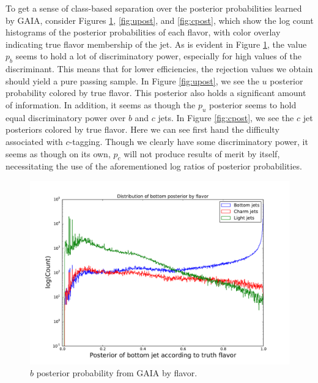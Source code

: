 To get a sense of class-based separation over the posterior probabilities learned by GAIA, consider Figures \ref{fig:bpost}, \ref{fig:upost}, and \ref{fig:cpost}, which show the log count histograms of the posterior probabilities of each flavor, with color overlay indicating true flavor membership of the jet. As is evident in Figure \ref{fig:bpost}, the value $p_b$ seems to hold a lot of discriminatory power, especially for high values of the discriminant. This means that for lower efficiencies, the rejection values we obtain should yield a pure passing sample. In Figure \ref{fig:upost}, we see the $u$ posterior probability colored by true flavor. This posterior also holds a significant amount of information. In addition, it seems as though the $p_u$ posterior seems to hold equal discriminatory power over $b$ and $c$ jets. In Figure \ref{fig:cpost}, we see the $c$ jet posteriors colored by true flavor. Here we can see first hand the difficulty associated with $c$-tagging. Though we clearly have some discriminatory power, it seems as though on its own, $p_c$ will not produce results of merit by itself, necessitating the use of the aforementioned log ratios of posterior probabilities. 



\begin{figure}[h]
\includegraphics[width=\textwidth]{figures/unweight_bottom_p_distro}
\caption[The ATLAS detector]{$b$ posterior probability from GAIA by flavor.
\label{fig:bpost}}
\end{figure}


